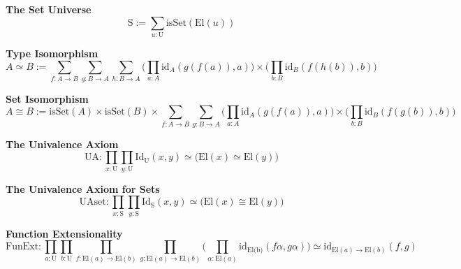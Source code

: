 \textbf{The Set Universe}
$$\text{S} := \sum_{u : \text{U}} \text{isSet}(\text{El}(u))$$

\textbf{Type Isomorphism}
$$A \simeq B := \sum_{f :A \to B}\sum_{g :B \to A}\sum_{h :B \to A}\Big(\prod_{a : A} \text{id}_{A}(g(f(a)),a) \Big) \times \Big(\prod_{b : B} \text{id}_{B}(f(h(b)),b) \Big)$$

\textbf{Set Isomorphism}
$$A \cong B := \text{isSet}(A) \times \text{isSet}(B)\times\sum_{f :A \to B}\sum_{g :B \to A}\Big(\prod_{a : A} \text{id}_{A}(g(f(a)),a) \Big) \times \Big(\prod_{b : B} \text{id}_{B}(f(g(b)),b) \Big)$$

\textbf{The Univalence Axiom}
$$\text{UA}: \prod_{x : \text{U}} \prod_{y : \text{U}} \text{Id}_{\text{U}}(x,y) \simeq \Big(\text{El}(x) \simeq \text{El}(y)\Big)$$

\textbf{The Univalence Axiom for Sets}
$$\text{UAset}: \prod_{x : \text{S}} \prod_{y : \text{S}} \text{Id}_{\text{S}}(x,y) \simeq \Big(\text{El}(x) \cong \text{El}(y)\Big)$$

\textbf{Function Extensionality}
$$\text{FunExt}: \prod_{a : \text{U}} \prod_{b : \text{U}} \prod_{f : \text{El}(a) \to \text{El}(b)} \prod_{g : \text{El}(a) \to \text{El}(b)}\Big( \prod_{\alpha : \text{El}(a)}\text{id}_{\text{El(b)}}(f\alpha,g\alpha)\Big) \simeq \text{id}_{\text{El}(a) \to \text{El}(b)}(f,g)$$
